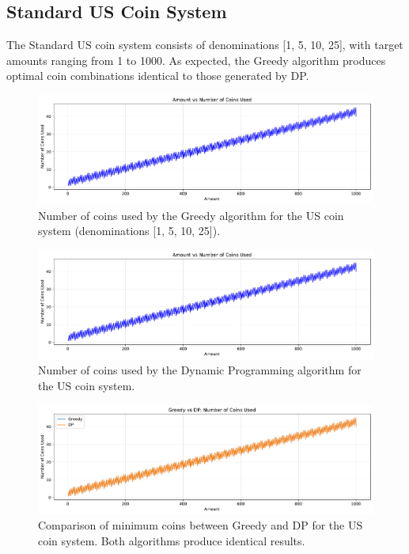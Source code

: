 \documentclass[12pt,a4paper]{report}
\begin{document}
\subsection{Standard US Coin System}
The Standard US coin system consists of denominations [1, 5, 10, 25], with target amounts ranging from 1 to 1000. As expected, the Greedy algorithm produces optimal coin combinations identical to those generated by DP.

\begin{figure}[H]
  \centering
  \includegraphics[width=\textwidth]{graphs/greedy_coins_standard_plot.pdf}
  \caption{Number of coins used by the Greedy algorithm for the US coin system (denominations [1, 5, 10, 25]).}
  \label{fig:greedy_coins_standard}
\end{figure}

\begin{figure}[H]
  \centering
  \includegraphics[width=\textwidth]{graphs/dp_coins_standard_plot.pdf}
  \caption{Number of coins used by the Dynamic Programming algorithm for the US coin system.}
  \label{fig:dp_coins_standard}
\end{figure}

\begin{figure}[H]
  \centering
  \includegraphics[width=\textwidth]{graphs/compare_coins_standard_plot.pdf}
  \caption{Comparison of minimum coins between Greedy and DP for the US coin system. Both algorithms produce identical results.}
  \label{fig:compare_coins_standard}
\end{figure}
\end{document}
